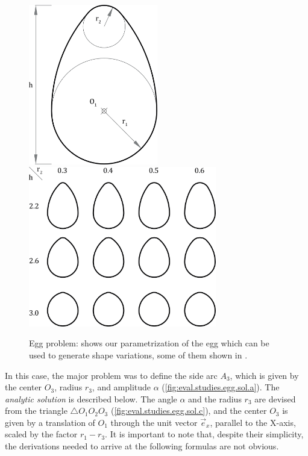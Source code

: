 \begin{figure}[htb]
    {\includegraphics[height=7cm]{fig/egg-problem-params}}
  \hfill
    {\includegraphics[height=7cm]{fig/egg-problem-vars}}
  \caption[Egg problem]{Egg problem:
   shows our parametrization of the
  egg which can be used to generate shape variations, some of them shown in
  .}\label{fig:eval.studies.egg.prob}
\end{figure}

In this case, the major problem was to define the side arc $A_3$, which is given
by the center $O_3$, radius $r_3$, and amplitude $\alpha$
(\cref{fig:eval.studies.egg.sol.a}). The \textit{analytic solution} is described
below. The angle $\alpha$ and the radius $r_3$ are devised from the triangle
$\triangle O_1 O_2 O_3$ (\cref{fig:eval.studies.egg.sol.c}), and the center
$O_3$ is given by a translation of $O_1$ through the unit vector $\vec{e}_x$,
parallel to the X-axis, scaled by the factor $r_1 - r_3$.  It is important to
note that, despite their simplicity, the derivations needed to arrive at the
following formulas are not obvious.

